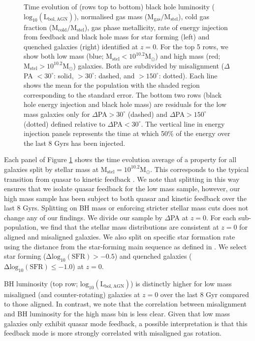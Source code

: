 \documentclass[fleqn,usenatbib]{mnras}
\begin{document}
\begin{figure}
    \caption{Time evolution of (rows top to bottom) black hole luminosity ($\mathrm{log_{10}(L_{bol, AGN})}$), normalised gas mass ($\mathrm{M_{gas}/M_{stel}}$), cold gas fraction ($\mathrm{M_{cold}/M_{stel}}$), gas phase metallicity, rate of energy injection from feedback and black hole mass for star forming (left) and quenched galaxies (right) identified at $z=0$. For the top 5 rows, we show both low mass (blue; $\mathrm{M_{stel} < 10^{10.2}M_{\odot}}$) and high mass (red; $\mathrm{M_{stel} > 10^{10.2}M_{\odot}}$) galaxies. Both are subdivided by misalignment ($\Delta$PA $< 30^{\circ}$: solid, $> 30^{\circ}$: dashed, and  $> 150^{\circ}$: dotted). Each line shows the mean for the population with the shaded region corresponding to the standard error. The bottom two rows (black hole energy injection and black hole mass) are residuals for the low mass galaxies only for $\Delta$PA$ > 30^{\circ}$ (dashed) and $\Delta$PA$ > 150^{\circ}$ (dotted) defined relative to $\Delta$PA$ < 30^{\circ}$. The vertical line in energy injection panels represents the time at which 50\% of the energy over the last 8 Gyrs has been injected.}
    \label{fig:overall_pop}
\end{figure}

Each panel of Figure \ref{fig:overall_pop} shows the time evolution average of a property for all galaxies split by stellar mass at $\mathrm{M_{stel} = 10^{10.2}M_{\odot}}$. This corresponds to the typical transition from quasar to kinetic feedback \citep[i.e. $\mathrm{M_{BH} \approx 10^{8}M_{\odot}}$, see Fig 1 in][]{li2019}. We note that splitting in this way ensures that we isolate quasar feedback for the low mass sample, however, our high mass sample has been subject to both quasar and kinetic feedback over the last 8 Gyrs. Splitting on BH mass or enforcing stricter stellar mass cuts does not change any of our findings. We divide our sample by $\Delta$PA at $z=0$. For each sub-population, we find that the stellar mass distributions are consistent at $z=0$ for aligned and misaligned galaxies. We also split on specific star formation rate using the distance from the star-forming main sequence as defined in \citet{pillepich2019}. We select star forming ($\mathrm{\Delta log_{10}(SFR) > −0.5}$) and quenched galaxies ($\mathrm{\Delta log_{10}(SFR) \leq -1.0}$) at $z=0$.

BH luminosity (top row; $\mathrm{log_{10}(L_{bol, AGN})}$) is distinctly higher for low mass misaligned (and counter-rotating) galaxies at $z=0$ over the last 8 Gyr compared to those aligned. In contrast, we note that the correlation between misalignment and BH luminosity for the high mass bin is less clear. Given that low mass galaxies only exhibit quasar mode feedback, a possible interpretation is that this feedback mode is more strongly correlated with misaligned gas rotation. 
\end{document}
